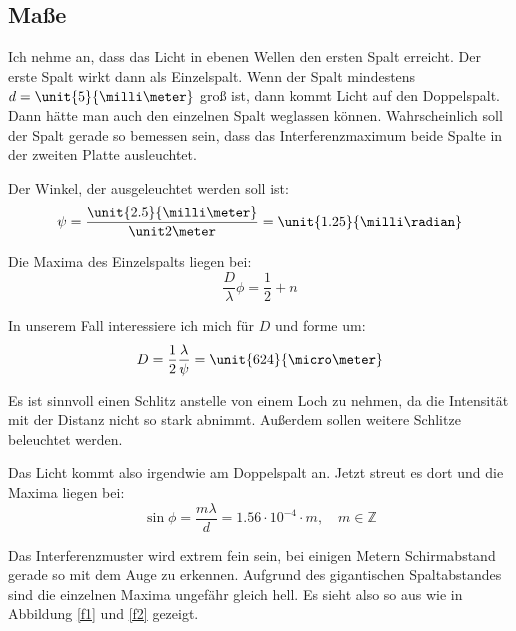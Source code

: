 \documentclass[11pt, ngerman, fleqn]{article}
\newcommand{\e}[1]{\cdot 10^{#1}}
\newcommand{\half}{\frac 12}
\begin{document}
\subsection{Maße}

Ich nehme an, dass das Licht in ebenen Wellen den ersten Spalt erreicht. Der
erste Spalt wirkt dann als Einzelspalt. Wenn der Spalt mindestens $d =
\unit{5}{\milli\meter}$ groß ist, dann kommt Licht auf den Doppelspalt. Dann
hätte man auch den einzelnen Spalt weglassen können. Wahrscheinlich soll der
Spalt gerade so bemessen sein, dass das Interferenzmaximum beide Spalte in der
zweiten Platte ausleuchtet.

Der Winkel, der ausgeleuchtet werden soll ist:
\[
	\psi = \frac{\unit{2.5}{\milli\meter}}{\unit 2 \meter} = \unit{1.25}{\milli\radian}
\]

Die Maxima des Einzelspalts liegen bei:
\[
	\frac D \lambda \phi = \half + n
\]

In unserem Fall interessiere ich mich für $D$ und forme um:
\[
	D = \half \frac \lambda \psi = \unit{624}{\micro\meter}
\]

Es ist sinnvoll einen Schlitz anstelle von einem Loch zu nehmen, da die
Intensität mit der Distanz nicht so stark abnimmt. Außerdem sollen weitere
Schlitze beleuchtet werden.

Das Licht kommt also irgendwie am Doppelspalt an. Jetzt streut es dort und die
Maxima liegen bei:
\[
	\sin\phi = \frac{m \lambda}{d} = 1.56\e{-4} \cdot m
	, \quad
	m \in \mathbb Z
\]

Das Interferenzmuster wird extrem fein sein, bei einigen Metern Schirmabstand
gerade so mit dem Auge zu erkennen. Aufgrund des gigantischen Spaltabstandes
sind die einzelnen Maxima ungefähr gleich hell. Es sieht also so aus wie in
Abbildung \ref{f1} und \ref{f2} gezeigt.
\end{document}
